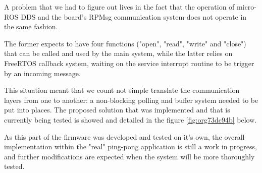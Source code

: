 \documentclass[10pt]{article}
\begin{document}
A problem that we had to figure out lives in the fact that the operation of micro-ROS DDS
and the board's RPMsg communication system does not operate in the same fashion.

The former expects to have four functions ("open", "read", "write" and "close") that can
be called and used by the main system, while the latter relies on FreeRTOS callback
system, waiting on the service interrupt routine to be trigger by an incoming message.

This situation meant that we count not simple translate the communication layers from one
to another: a non-blocking polling and buffer system needed to be put into places.
The proposed solution that was implemented and that is currently being tested
is showed and detailed in the figure \ref{fig:org73dc94b} below.

As this part of the firmware was developed and tested on it's own, the overall
implementation within the "real" ping-pong application is still a work in progress,
and further modifications are expected when the system will be more thoroughly tested.
\end{document}
